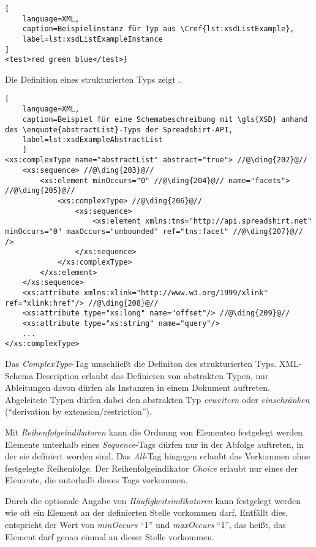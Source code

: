 \begin{lstlisting}[
    language=XML,
    caption=Beispielinstanz für Typ aus \Cref{lst:xsdListExample},
    label=lst:xsdListExampleInstance
]
<test>red green blue</test>}
\end{lstlisting}

Die Definition eines strukturierten Typs zeigt .

\begin{lstlisting}[
    language=XML, 
    caption=Beispiel für eine Schemabeschreibung mit \gls{XSD} anhand des \enquote{abstractList}-Typs der Spreadshirt-API,
    label=lst:xsdExampleAbstractList
    ]
<xs:complexType name="abstractList" abstract="true"> //@\ding{202}@//
    <xs:sequence> //@\ding{203}@//
        <xs:element minOccurs="0" //@\ding{204}@// name="facets"> //@\ding{205}@//
            <xs:complexType> //@\ding{206}@//
                <xs:sequence>
                    <xs:element xmlns:tns="http://api.spreadshirt.net" minOccurs="0" maxOccurs="unbounded" ref="tns:facet" //@\ding{207}@// />
                </xs:sequence>
            </xs:complexType>
        </xs:element>
    </xs:sequence>
    <xs:attribute xmlns:xlink="http://www.w3.org/1999/xlink" ref="xlink:href"/> //@\ding{208}@//
    <xs:attribute type="xs:long" name="offset"/> //@\ding{209}@//
    <xs:attribute type="xs:string" name="query"/>        
    ...
</xs:complexType>
\end{lstlisting}

Das \emph{ComplexType}-Tag  umschließt die Definiton des strukturierten Typs. \gls{XML}-Schema Description erlaubt das Definieren von abstrakten Typen, nur Ableitungen davon dürfen als Instanzen in einem Dokument auftreten. Abgeleitete Typen dürfen dabei den abstrakten Typ \emph{erweitern} oder \emph{einschränken} (\enquote{derivation by extension/restriction}).

Mit \emph{Reihenfolgeindikatoren}  kann die Ordnung von Elementen festgelegt werden. Elemente unterhalb eines \emph{Sequence}-Tags dürfen nur in der Abfolge auftreten, in der sie definiert worden sind. Das \emph{All}-Tag  hingegen erlaubt das Vorkommen ohne festgelegte Reihenfolge. Der Reihenfolgeindikator \emph{Choice} erlaubt nur eines der Elemente, die unterhalb dieses Tags vorkommen.

Durch die optionale Angabe von \emph{Häufigkeitsindikatoren}  kann festgelegt werden wie oft ein Element an der definierten Stelle vorkommen darf. Entfällt dies, entspricht der Wert von \emph{minOccurs} \enquote{1} und \emph{maxOccurs} \enquote{1}, das heißt, das Element darf genau einmal an dieser Stelle vorkommen.

